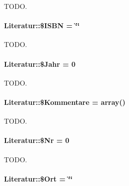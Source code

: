 TODO. 

\hypertarget{classLiteratur_9e3b00766297a68adac423980767dd3c}{
\paragraph[\$ISBN]{\setlength{\rightskip}{0pt plus 5cm}Literatur::\$ISBN = \char`\"{}\char`\"{}}\hfill}
\label{classLiteratur_9e3b00766297a68adac423980767dd3c}


TODO. 

\hypertarget{classLiteratur_2cb6f40a8757a0edd5da32385ad009c9}{
\paragraph[\$Jahr]{\setlength{\rightskip}{0pt plus 5cm}Literatur::\$Jahr = 0}\hfill}
\label{classLiteratur_2cb6f40a8757a0edd5da32385ad009c9}


TODO. 

\hypertarget{classLiteratur_ebcaeb5c38ce2677a14189da511fa663}{
\paragraph[\$Kommentare]{\setlength{\rightskip}{0pt plus 5cm}Literatur::\$Kommentare = array()}\hfill}
\label{classLiteratur_ebcaeb5c38ce2677a14189da511fa663}


TODO. 

\hypertarget{classLiteratur_036a682a93a5d50839c1ebc70a79d4b6}{
\paragraph[\$Nr]{\setlength{\rightskip}{0pt plus 5cm}Literatur::\$Nr = 0}\hfill}
\label{classLiteratur_036a682a93a5d50839c1ebc70a79d4b6}


TODO. 

\hypertarget{classLiteratur_da6c458bb229187efea8e8f144a1d279}{
\paragraph[\$Ort]{\setlength{\rightskip}{0pt plus 5cm}Literatur::\$Ort = \char`\"{}\char`\"{}}\hfill}
\label{classLiteratur_da6c458bb229187efea8e8f144a1d279}


